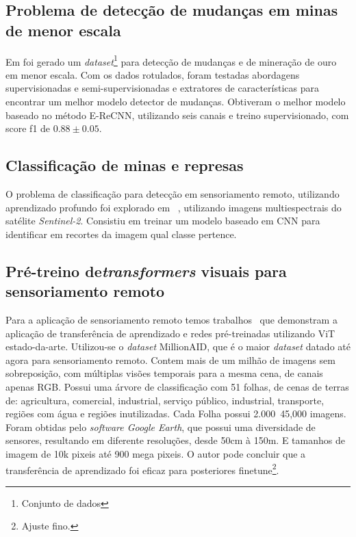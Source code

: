 \subsection{Problema de detecção de mudanças em minas de menor escala}\label{sec:Cap2_deteccao_mudanca}

Em \cite{rs14071746} foi gerado um \textit{dataset}\footnote{Conjunto de dados} para detecção de mudanças e de mineração de ouro em menor escala. Com os dados rotulados, foram testadas abordagens supervisionadas e semi-supervisionadas e extratores de características para encontrar um melhor modelo detector de mudanças. Obtiveram o melhor modelo baseado no método E-ReCNN, utilizando seis canais e treino supervisionado, com score f1 de $0.88\pm0.05$.

\subsection{Classificação de minas e represas}\label{sec:Cap2_minas_represa_classificacao}

O problema de classificação para detecção em sensoriamento remoto, utilizando aprendizado profundo foi explorado em ~\cite{s20236936}, utilizando imagens multiespectrais do satélite \textit{Sentinel-2}. Consistiu em treinar um modelo baseado em CNN para identificar em recortes da imagem qual classe pertence.

\subsection{Pré-treino de\textit{transformers} visuais para sensoriamento remoto}\label{sec:Cap2_million}

Para a aplicação de sensoriamento remoto temos trabalhos~\cite{wang2022empirical} que demonstram a aplicação de transferência de aprendizado e redes pré-treinadas utilizando ViT estado-da-arte. Utilizou-se o \textit{dataset} MillionAID, que é o maior \textit{dataset} datado até agora para sensoriamento remoto. Contem mais de um milhão de imagens sem sobreposição, com múltiplas visões temporais para a mesma cena, de canais apenas RGB. Possui uma árvore de classificação com 51 folhas, de cenas de terras de: agricultura, comercial, industrial, serviço público, industrial, transporte, regiões com água e regiões inutilizadas. Cada Folha possui 2.000~45,000 imagens. Foram obtidas pelo \textit{software Google Earth}, que possui uma diversidade de sensores, resultando em diferente resoluções, desde 50cm à 150m. E tamanhos de imagem de 10k pixeis até 900 mega pixeis.
O autor pode concluir que a transferência de aprendizado foi eficaz para posteriores finetune\footnote{Ajuste fino.}.

